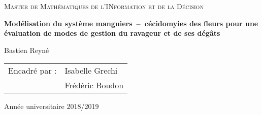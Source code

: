 
\begin{titlingpage}


\vspace*{2.5cm}

\begin{center}
 
 {\large \textsc{Master de Mathématiques de l'INformation et de la Décision}}


 \vspace*{2cm}
 
 
 {\Large \textbf{Modélisation du système manguiers~--~cécidomyies des fleurs pour une évaluation de modes de gestion du ravageur et de ses dégâts}}
 \vspace*{1cm}
 
 Bastien Reyné
 
\end{center}

\vspace*{2cm}

\noindent
\begin{tabular}{ll}
Encadré par : & Isabelle Grechi\\
 & Frédéric Boudon
\end{tabular}

\vspace*{2cm}

\begin{center}
\end{center}



\vfill

\begin{center}
 Année universitaire 2018/2019
\end{center}


\end{titlingpage}

